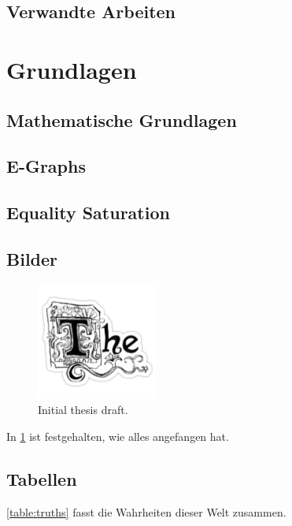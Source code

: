 \subsection{Verwandte Arbeiten}



\section{Grundlagen}

\subsection{Mathematische Grundlagen}

\subsection{E-Graphs}

\subsection{Equality Saturation}



\subsection{Bilder}%
\label{sec:figures}

\begin{figure}[h]
  \includegraphics[width=4cm]{fig/the.png}
  \caption{Initial thesis draft.}%
  \label{fig:initial-draft}
\end{figure}

In \cref{fig:initial-draft} ist festgehalten,
wie alles angefangen hat.


\subsection{Tabellen}%
\label{sec:tables}

\cref{table:truths} fasst die Wahrheiten dieser Welt zusammen.

